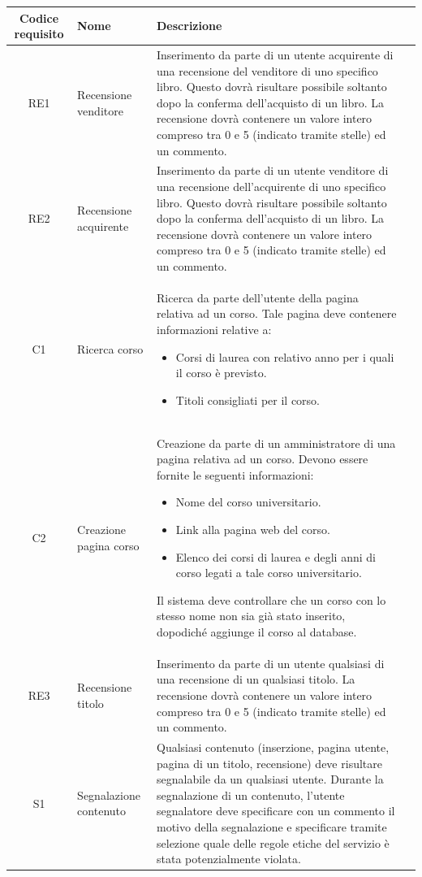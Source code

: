 \documentclass[10pt,a4paper]{report}
\begin{document}
	\begin{tabular}{cp{3cm}p{9cm}p{1cm}}
		Codice requisito&Nome&Descrizione\\ \hline
		RE1&Recensione venditore&Inserimento da parte di un utente acquirente di una recensione del venditore di uno specifico libro. Questo dovrà risultare possibile soltanto dopo la conferma dell'acquisto di un libro. La recensione dovrà contenere un valore intero compreso tra 0 e 5 (indicato tramite stelle) ed un commento.\\ \hline
		RE2&Recensione acquirente&Inserimento da parte di un utente venditore di una recensione dell'acquirente di uno specifico libro. Questo dovrà risultare possibile soltanto dopo la conferma dell'acquisto di un libro. La recensione dovrà contenere un valore intero compreso tra 0 e 5 (indicato tramite stelle) ed un commento.\\ \hline
		C1&Ricerca corso&Ricerca da parte dell'utente della pagina relativa ad un corso. Tale pagina deve contenere informazioni relative a:
		\begin{itemize}
			\item Corsi di laurea con relativo anno per i quali il corso è previsto.
			\item Titoli consigliati per il corso.
		\end{itemize}\\ \hline
		C2&Creazione pagina corso&Creazione da parte di un amministratore di una pagina relativa ad un corso. Devono essere fornite le seguenti informazioni:
		\begin{itemize}
			\item Nome del corso universitario.
			\item Link alla pagina web del corso.
			\item Elenco dei corsi di laurea e degli anni di corso legati a tale corso universitario.
		\end{itemize}
		Il sistema deve controllare che un corso con lo stesso nome non sia già stato inserito, dopodiché aggiunge il corso al database. \\ \hline
		RE3&Recensione titolo&Inserimento da parte di un utente qualsiasi di una recensione di un qualsiasi titolo. La recensione dovrà contenere un valore intero compreso tra 0 e 5 (indicato tramite stelle) ed un commento.\\ \hline
		S1&Segnalazione contenuto&Qualsiasi contenuto (inserzione, pagina utente, pagina di un titolo, recensione) deve risultare segnalabile da un qualsiasi utente. Durante la segnalazione di un contenuto, l'utente segnalatore deve specificare con un commento il motivo della segnalazione e specificare tramite selezione quale delle regole etiche del servizio è stata potenzialmente violata.\\ \hline

\end{tabular}
\end{document}
